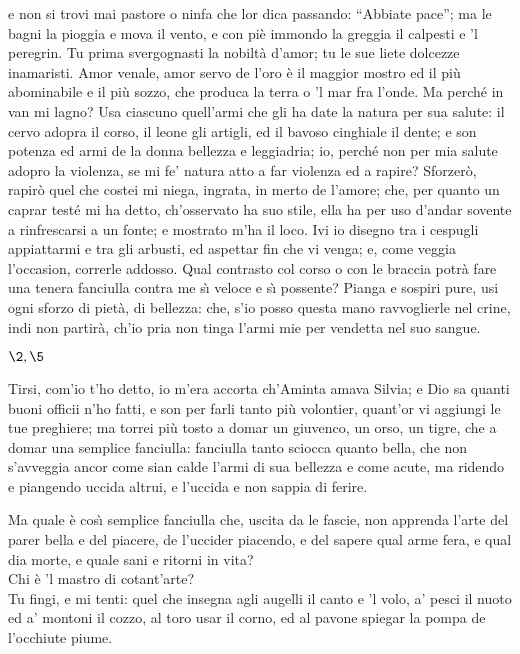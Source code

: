 \documentclass{book}
\begin{document}
	e non si trovi mai pastore o ninfa
	che lor dica passando: ``Abbiate pace'';
	ma le bagni la pioggia e mova il vento,
	e con pi\`e immondo la greggia il calpesti
	e 'l peregrin. Tu prima svergognasti
	la nobilt\`a d'amor; tu le sue liete
	dolcezze inamaristi. Amor venale,
	amor servo de l'oro \`e il maggior mostro
	ed il pi\`u abominabile e il pi\`u sozzo,
	che produca la terra o 'l mar fra l'onde.
	Ma perch\'e in van mi lagno? Usa ciascuno
	quell'armi che gli ha date la natura
	per sua salute: il cervo adopra il corso,
	il leone gli artigli, ed il bavoso
	cinghiale il dente; e son potenza ed armi
	de la donna bellezza e leggiadria;
	io, perch\'e non per mia salute adopro
	la violenza, se mi fe' natura
	atto a far violenza ed a rapire?
	Sforzer\`o, rapir\`o quel che costei
	mi niega, ingrata, in merto de l'amore;
	che, per quanto un caprar test\'e mi ha detto,
	ch'osservato ha suo stile, ella ha per uso
	d'andar sovente a rinfrescarsi a un fonte;
	e mostrato m'ha il loco. Ivi io disegno
	tra i cespugli appiattarmi e tra gli arbusti,
	ed aspettar fin che vi venga; e, come
	veggia l'occasion, correrle addosso.
	Qual contrasto col corso o con le braccia
	potr\`a fare una tenera fanciulla
	contra me s\`{\i} veloce e s\`{\i} possente?
	Pianga e sospiri pure, usi ogni sforzo
	di piet\`a, di bellezza: che, s'io posso
	questa mano ravvoglierle nel crine,
	indi non partir\`a, ch'io pria non tinga
	l'armi mie per vendetta nel suo sangue.


\Scena

\(\2, \5\)

	\2 Tirsi, com'io t'ho detto, io m'era accorta
	ch'Aminta amava Silvia; e Dio sa quanti
	buoni officii n'ho fatti, e son per farli
	tanto pi\`u volontier, quant'or vi aggiungi
	le tue preghiere; ma torrei pi\`u tosto
	a domar un giuvenco, un orso, un tigre,
	che a domar una semplice fanciulla:
	fanciulla tanto sciocca quanto bella,
	che non s'avveggia ancor come sian calde
	l'armi di sua bellezza e come acute,
	ma ridendo e piangendo uccida altrui,
	e l'uccida e non sappia di ferire.

	\5 Ma quale \`e cos\`{\i} semplice fanciulla
	che, uscita da le fascie, non apprenda
	l'arte del parer bella e del piacere,
	de l'uccider piacendo, e del sapere
	qual arme fera, e qual dia morte, e quale
	sani e ritorni in vita? \\

   \2 Chi \`e 'l mastro
	di cotant'arte? \\

   \5 Tu fingi, e mi tenti:
	quel che insegna agli augelli il canto e 'l volo,
	a' pesci il nuoto ed a' montoni il cozzo,
	al toro usar il corno, ed al pavone
	spiegar la pompa de l'occhiute piume.
\end{document}
